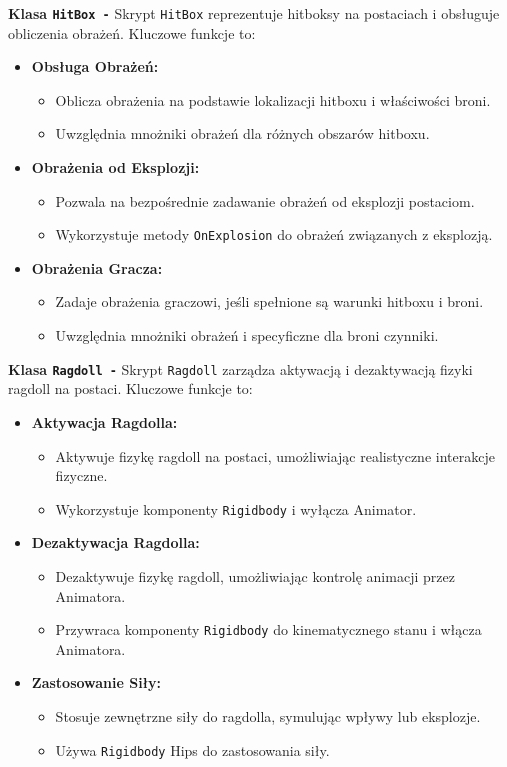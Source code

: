 \textbf{Klasa \texttt{HitBox -}}
Skrypt \texttt{HitBox} reprezentuje hitboksy na postaciach i obsługuje obliczenia obrażeń. Kluczowe funkcje to:
\begin{itemize}
\item \textbf{Obsługa Obrażeń:}
    \begin{itemize}
        \item Oblicza obrażenia na podstawie lokalizacji hitboxu i właściwości broni.
        \item Uwzględnia mnożniki obrażeń dla różnych obszarów hitboxu.
    \end{itemize}
\item \textbf{Obrażenia od Eksplozji:}
    \begin{itemize}
        \item Pozwala na bezpośrednie zadawanie obrażeń od eksplozji postaciom.
        \item Wykorzystuje metody \texttt{OnExplosion} do obrażeń związanych z eksplozją.
    \end{itemize}
\item \textbf{Obrażenia Gracza:}
    \begin{itemize}
        \item Zadaje obrażenia graczowi, jeśli spełnione są warunki hitboxu i broni.
        \item Uwzględnia mnożniki obrażeń i specyficzne dla broni czynniki.
    \end{itemize}
\end{itemize}

\textbf{Klasa \texttt{Ragdoll -}}
Skrypt \texttt{Ragdoll} zarządza aktywacją i dezaktywacją fizyki ragdoll na postaci. Kluczowe funkcje to:
\begin{itemize}
\item \textbf{Aktywacja Ragdolla:}
    \begin{itemize}
        \item Aktywuje fizykę ragdoll na postaci, umożliwiając realistyczne interakcje fizyczne.
        \item Wykorzystuje komponenty \texttt{Rigidbody} i wyłącza Animator.
    \end{itemize}
\item \textbf{Dezaktywacja Ragdolla:}
    \begin{itemize}
        \item Dezaktywuje fizykę ragdoll, umożliwiając kontrolę animacji przez Animatora.
        \item Przywraca komponenty \texttt{Rigidbody} do kinematycznego stanu i włącza Animatora.
    \end{itemize}
\item \textbf{Zastosowanie Siły:}
    \begin{itemize}
        \item Stosuje zewnętrzne siły do ragdolla, symulując wpływy lub eksplozje.
        \item Używa \texttt{Rigidbody} Hips do zastosowania siły.
    \end{itemize}
\end{itemize}

